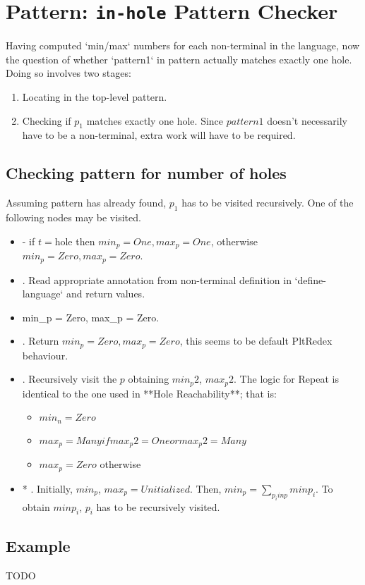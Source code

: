 \section{Pattern: \lstinline{in-hole} Pattern Checker}

Having computed `min/max` numbers for each non-terminal in the language, now the question of whether `pattern1` in pattern \InHolePattern actually matches exactly one hole. Doing so involves two stages: 

\begin{enumerate}
\item
Locating \InHolePattern in the top-level pattern.
\item
Checking if $p_1$ matches exactly one hole. Since $pattern1$ doesn't necessarily have to be a non-terminal, extra work will have to be required.
\end{enumerate}

\subsection{Checking pattern for number of holes}

Assuming \InHolePattern pattern has already found, $p_1$ has to be visited recursively. One of the following nodes may be visited.

\begin{itemize}
\item
\BuiltInPattern - if $t=$hole then $min_p = One, max_p = One$, otherwise $min_p = Zero, max_p=Zero$.

\item
\Nt. Read appropriate annotation from non-terminal definition in `define-language` and return values.

\item

\LiteralPattern min\_p = Zero, max\_p = Zero.

\item
\InHolePattern. Return $min_p = Zero, max_p = Zero$, this seems to be default PltRedex behaviour.

\item
\Repeat. Recursively visit the $p$ obtaining $min_p2$, $max_p2$. The logic for Repeat is identical to the one used in **Hole Reachability**; that is:
	\begin{itemize}
	\item
	$min_n = Zero$
	\item
	$max_p = Many if max_p2 = One or max_p2 = Many$
	\item
	$max_p = Zero$ otherwise
	\end{itemize}

\item
* \PatternSequence. Initially, $min_p$, $max_p = Unitialized$. Then, $min_p = \sum_{p_i in p} minp_i$. To obtain $minp_i$, $p_i$ has to be recursively visited.
\end{itemize}

\subsection{Example}
TODO
